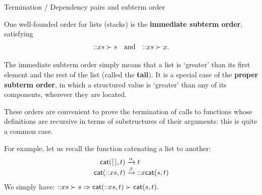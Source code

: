 %
\begin{frame}{Termination / Dependency pairs and subterm order}

  One well\hyp{}founded order for lists (stacks) is the
  \textbf{immediate subterm order}, satisfying
  \begin{equation*}
    \textsf{::}{x}{s} \succ s \quad \text{and} \quad \textsf{::}{x}{s} \succ x.
  \end{equation*}

  The immediate subterm order simply means that a list is `greater'
  than its first element and the rest of the list (called the
  \textbf{tail}). It is a special case of the \textbf{proper subterm
    order}, in which a structured value is `greater' than any of its
  components, wherever they are located.

  \bigskip

  These orders are convenient to prove the termination of calls to
  functions whose definitions are recursive in terms of substructures
  of their arguments: this is quite a common case.

  \bigskip

  For example, let us recall the function catenating a list to
  another:
  \begin{align*}
    \textsf{cat}(        [\,],t) &\xrightarrow{\alpha} t\\
    \textsf{cat}(\textsf{::}{x}{s},t) &\xrightarrow{\smash{\beta}}
    \textsf{::}{x}{\textsf{cat}(s,t)}
  \end{align*}
  We simply have: \(\textsf{::}{x}{s} \succ s \Rightarrow
  \textsf{cat}(\textsf{::}{x}{s},t) \succ \textsf{cat}(s,t).\)

\end{frame}

